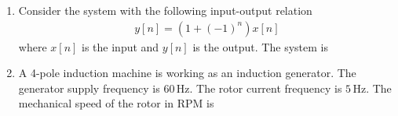 \documentclass[journal,12pt,onecolumn]{IEEEtran}
\theoremstyle{remark}
\begin{document}
\begin{enumerate}
\begin{enumerate}
\end{enumerate}

\item Consider the system with the following input-output relation
\begin{align*}
    y[n] = (1 + (-1)^n)x[n]
\end{align*}
where $x[n]$ is the input and $y[n]$ is the output. The system is

\begin{enumerate}
\end{enumerate}


\item A 4-pole induction machine is working as an induction generator. The generator supply frequency is $60 \,\text{Hz}$. The rotor current frequency is $5 \,\text{Hz}$. The mechanical speed of the rotor in RPM is

\begin{enumerate}
\end{enumerate}





\end{enumerate}
\end{document}
